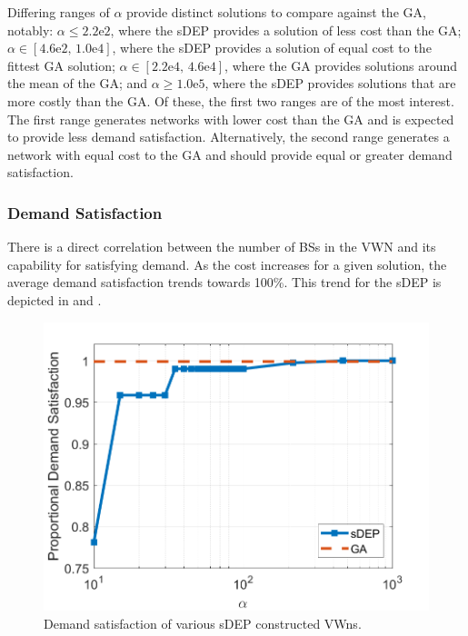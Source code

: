 \documentclass[12pt,dvipsnames]{report}
\newcommand{\expnumber}[2]{{#1}\mathrm{e}{#2}}
\begin{document}
Differing ranges of $\alpha$ provide distinct solutions to compare against the GA, notably: $\alpha \leq \expnumber{2.2}{2}$, where the sDEP provides a solution of less cost than the GA; $\alpha \in \left[ \expnumber{4.6}{2},\, \expnumber{1.0}{4} \right]$, where the sDEP provides a solution of equal cost to the fittest GA solution; $\alpha \in \left[ \expnumber{2.2}{4},\, \expnumber{4.6}{4} \right]$, where the GA provides solutions around the mean of the GA; and $\alpha \geq \expnumber{1.0}{5}$, where the sDEP provides solutions that are more costly than the GA.  Of these, the first two ranges are of the most interest.  The first range generates networks with lower cost than the GA and is expected to provide less demand satisfaction.  Alternatively, the second range generates a network with equal cost to the GA and should provide equal or greater demand satisfaction.

\subsubsection{Demand Satisfaction}

There is a direct correlation between the number of BSs in the VWN and its capability for satisfying demand.  As the cost increases for a given solution, the average demand satisfaction trends towards 100\%.  This trend for the sDEP is depicted in  and .

\begin{figure}[htp]
	\centering
	\includegraphics[height=0.4\textheight]{Figures/Prelim_O25_VOSDemandSatisfaction}
	\caption[Preliminary simulation sDEP demand satisfaction]{Demand satisfaction of various sDEP constructed VWns.}
	\label{fig:Prelim_VOSDemandSatisfaction}
\end{figure}
\end{document}
